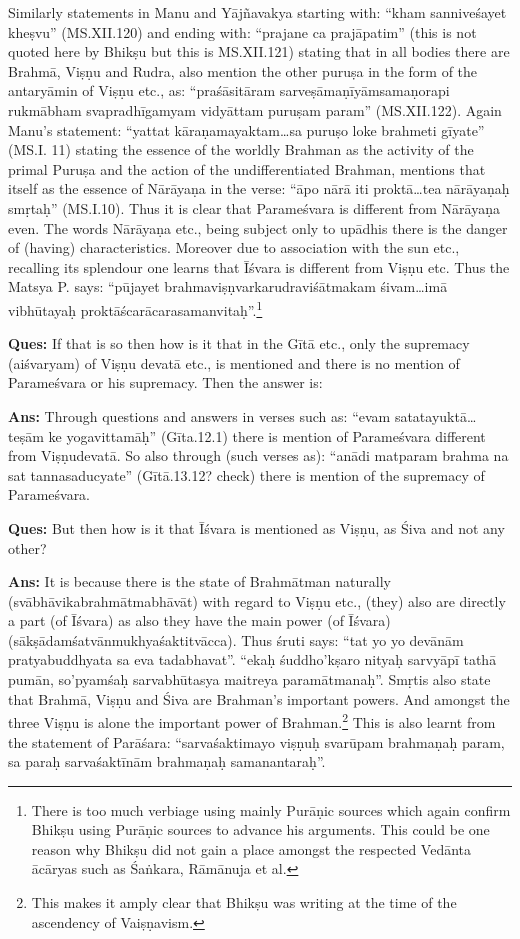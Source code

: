 Similarly statements in Manu and Yājñavakya starting with: “kham sanniveśayet kheṣvu” (MS.XII.120) and ending with: “prajane ca prajāpatim” (this is not quoted here by Bhikṣu but this is MS.XII.121) stating that in all bodies there are Brahmā, Viṣṇu and Rudra, also mention the other puruṣa in the form of the antaryāmin of Viṣṇu etc., as: “praśāsitāram sarveṣāmaṇīyāmsamaṇorapi rukmābham svapradhīgamyam vidyāttam puruṣam param” (MS.XII.122). Again Manu’s statement: “yattat kāraṇamayaktam…sa puruṣo loke brahmeti gīyate” (MS.I. 11) stating the essence of the worldly Brahman as the activity of the primal Puruṣa and the action of the undifferentiated Brahman, mentions that itself as the essence of Nārāyaṇa in the verse: “āpo nārā iti proktā…tea nārāyaṇaḥ smṛtaḥ” (MS.I.10). Thus it is clear that Parameśvara is different from Nārāyaṇa even. The words Nārāyaṇa etc., being subject only to upādhis there is the danger of (having) characteristics. Moreover due to association with the sun etc., recalling its splendour one learns that Īśvara is different from Viṣṇu etc. Thus the Matsya P. says: “pūjayet brahmaviṣṇvarkarudraviśātmakam śivam…imā vibhūtayaḥ proktāścarācarasamanvitaḥ”.\footnote{There is too much verbiage using mainly Purāṇic sources which again confirm Bhikṣu using Purāṇic sources to advance his arguments. This could be one reason why Bhikṣu did not gain a place amongst the respected Vedānta ācāryas such as Śaṅkara, Rāmānuja et al.}

\textbf{Ques:} If that is so then how is it that in the Gītā etc., only the supremacy (aiśvaryam) of Viṣṇu devatā etc., is mentioned and there is no mention of Parameśvara or his supremacy. Then the answer is: 

\textbf{Ans:} Through questions and answers in verses such as: “evam satatayuktā…teṣām ke yogavittamāḥ” (Gīta.12.1) there is mention of Parameśvara different from Viṣṇudevatā. So also through (such verses as): “anādi matparam brahma na sat tannasaducyate” (Gītā.13.12? check) there is mention of the supremacy of Parameśvara.

\textbf{Ques:} But then how is it that Īśvara is mentioned as Viṣṇu, as Śiva and not any other? 

\textbf{Ans:} It is because there is the state of Brahmātman naturally (svābhāvikabrahmātmabhāvāt) with regard to Viṣṇu etc., (they) also are  directly a part (of Īśvara) as also  they have the main power (of Īśvara) (sākṣādamśatvānmukhyaśaktitvācca). Thus śruti says: “tat yo yo devānām pratyabuddhyata sa eva tadabhavat”. “ekaḥ śuddho’kṣaro nityaḥ sarvyāpī tathā pumān, so’pyamśaḥ sarvabhūtasya maitreya paramātmanaḥ”.  Smṛtis also state that Brahmā, Viṣṇu and Śiva are Brahman’s important powers. And amongst the three Viṣṇu is alone the important power of Brahman.\footnote{This makes it amply clear that Bhikṣu was writing at the time of the ascendency of Vaiṣṇavism.} This is also learnt from the statement of Parāśara: “sarvaśaktimayo viṣṇuḥ svarūpam brahmaṇaḥ param, sa paraḥ sarvaśaktīnām brahmaṇaḥ samanantaraḥ”.

